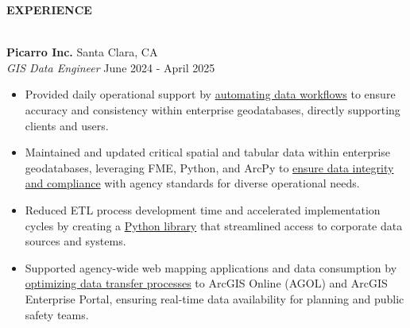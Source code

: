 \documentclass[letterpaper]{article}
\newcommand{\lineunder} {
        \vspace*{-8pt} \\
        \hspace*{-18pt} \hrulefill \\
    }
\newcommand{\header} [1] {
        \vspace{9pt}
        {\hspace*{-18pt}\vspace*{6pt} \large \textbf {#1}}
        \vspace*{-6pt} \lineunder
        \vspace{2pt}
    }
\newcommand{\employer}[4]{
        \vspace{3pt}
        \textbf{#1}  %
        \hfill #2\\  %
        \textit{#3}  %
        \hfill #4\\  %
        \vspace{3mm}
    }
\newenvironment{jobtasklist}
        {
            \vspace{-12pt}
            \begin{itemize} \itemsep 0pt
        }{
            \end{itemize}
            \vspace{-3pt}
        }
\newcommand{\impt}[1]{\uline{#1}}
\begin{document}
\header{EXPERIENCE}



\employer
    {Picarro Inc.}
    {Santa Clara, CA}
    {GIS Data Engineer}
    {June 2024 - April 2025}

\begin{jobtasklist}
    \item Provided daily operational support by \impt{automating data workflows} to ensure accuracy and consistency
            within enterprise geodatabases, directly supporting clients and users.
    \item Maintained and updated critical spatial and tabular data within enterprise geodatabases,
            leveraging FME, Python, and ArcPy to \impt{ensure data integrity and compliance} with agency standards for
            diverse operational needs.
    \item Reduced ETL process development time and accelerated implementation cycles by
            creating a \impt{Python library} that streamlined access to corporate data sources and systems.
    \item Supported agency-wide web mapping applications and data
            consumption by \impt{optimizing data transfer processes} to ArcGIS Online
            (AGOL) and ArcGIS Enterprise Portal, ensuring real-time data
            availability for planning and public safety teams.
\end{jobtasklist}
\end{document}
